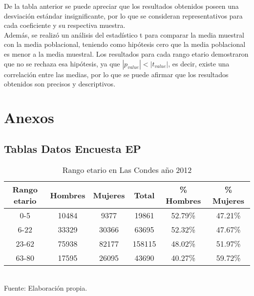 \documentclass[12pt]{article} %
\begin{document}
De la tabla anterior se puede apreciar que los resultados obtenidos poseen una desviación estándar insignificante, por lo que se 
consideran representativos para cada coeficiente y su respectiva muestra.\\

Además, se realizó un análisis del estadístico t para 
comparar la media muestral con la media poblacional, teniendo como hipótesis cero que la media poblacional es menor a la media muestral.
Los resultados para cada rango etario demostraron que no se rechaza esa hipótesis, ya que \(\left| p_{value} \right| < \left| t_{value} \right|\), es decir, existe una correlación entre las medias, 
por lo que se puede afirmar que los resultados obtenidos son precisos y descriptivos.

\section{Anexos}

\subsection{Tablas Datos Encuesta EP}

\begin{table}[H]
    \centering
    \caption{Rango etario en Las Condes año 2012}
    \vspace{0.2cm}
    \begin{tabular}{|c|c|c|c|c|c|}
        \hline
        \textbf{Rango etario} & \textbf{Hombres} & \textbf{Mujeres} & \textbf{Total} & \textbf{\% Hombres} & \textbf{\% Mujeres} \\ \hline
        0-5 & 10484 & 9377 & 19861 & 52.79\% & 47.21\% \\ \hline
        6-22 & 33329 & 30366 & 63695 & 52.32\% & 47.67\% \\ \hline
        23-62 & 75938 & 82177 & 158115 & 48.02\% & 51.97\% \\ \hline
        63-80 & 17595 & 26095 & 43690 & 40.27\% & 59.72\% \\ \hline
    \end{tabular}
    \label{Cuadro 4}
    \vspace{0.2cm}
    \\Fuente: Elaboración propia.
\end{table}
\end{document}
